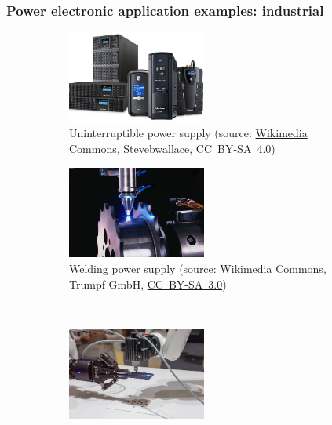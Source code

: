 \begin{frame}[c]
	\frametitle{Power electronic application examples: industrial}
	\begin{figure}
		\centering
		\begin{subfigure}[b]{0.49\textwidth}
			\centering
			\includegraphics[width=0.5\textwidth]{fig/lec01/UPS.jpg}
			\caption{Uninterruptible power supply (source: \href{https://commons.wikimedia.org/wiki/File:CyberPower_UPS_Systems.jpg}{Wikimedia Commons}, Stevebwallace, \href{https://creativecommons.org/licenses/by-sa/4.0/deed.en}{CC~BY-SA~4.0})}
		\end{subfigure}
		\pause
		\hfill
		\begin{subfigure}[b]{0.49\textwidth}
			\centering
			\includegraphics[width=0.5\textwidth]{fig/lec01/Welding.jpg}
			\caption{Welding power supply (source: \href{https://commons.wikimedia.org/wiki/File:Trumpf_laserschweissen.jpg}{Wikimedia Commons}, Trumpf GmbH, \href{https://creativecommons.org/licenses/by-sa/3.0/deed.en}{CC~BY-SA~3.0})}
		\end{subfigure}
		\pause
		\\
		\begin{subfigure}[b]{0.49\textwidth}
			\centering
			\includegraphics[width=0.5\textwidth]{fig/lec01/Robot.jpg}

\end{subfigure}
\end{figure}
\end{frame}
